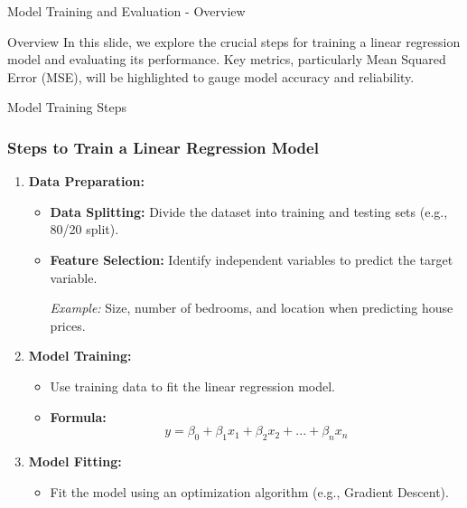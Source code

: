 \documentclass[aspectratio=169]{beamer}
\begin{document}
\begin{frame}[fragile]{Model Training and Evaluation - Overview}
    \begin{block}{Overview}
        In this slide, we explore the crucial steps for training a linear regression model and evaluating its performance. 
        Key metrics, particularly Mean Squared Error (MSE), will be highlighted to gauge model accuracy and reliability.
    \end{block}
\end{frame}

\begin{frame}[fragile]{Model Training Steps}
    \frametitle{Steps to Train a Linear Regression Model}
    \begin{enumerate}
        \item \textbf{Data Preparation:}
            \begin{itemize}
                \item \textbf{Data Splitting:} Divide the dataset into training and testing sets (e.g., 80/20 split).
                \item \textbf{Feature Selection:} Identify independent variables to predict the target variable.
                
                \textit{Example:} Size, number of bedrooms, and location when predicting house prices.
            \end{itemize}

        \item \textbf{Model Training:}
            \begin{itemize}
                \item Use training data to fit the linear regression model.
                \item \textbf{Formula:} \begin{equation}
                    y = \beta_0 + \beta_1 x_1 + \beta_2 x_2 + ... + \beta_n x_n
                \end{equation}
            \end{itemize}

        \item \textbf{Model Fitting:}
            \begin{itemize}
                \item Fit the model using an optimization algorithm (e.g., Gradient Descent).
            \end{itemize}
    \end{enumerate}
\end{frame}
\end{document}
